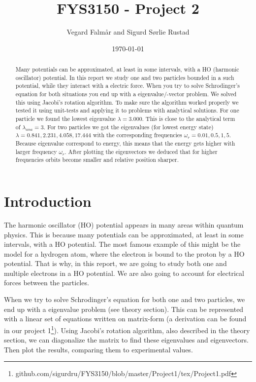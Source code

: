 \documentclass[reprint,english,notitlepage,nofootinbib]{revtex4-1}  %
\begin{document}
\title{FYS3150 - Project 2}
\date{\today}
\author{Vegard Falmår and Sigurd Sørlie Rustad}

\newpage

\begin{abstract}

	
Many potentials can be approximated, at least in some intervals, with a HO (harmonic oscillator) potential. In this report we study one and two particles bounded in a such potential, while they interact with a electric force. When you try to solve Schrodinger's equation for both situations you end up with a eigenvalue/-vector problem. We solved this using Jacobi's rotation algorithm. To make sure the algorithm worked properly we tested it using unit-tests and applying it to problems with analytical solutions. For one particle we found the lowest eigenvalue $\lambda = 3.000$. This is close to the analytical term of $\lambda_{ana} = 3$. For two particles we got the eigenvalues (for lowest energy state) $\lambda = 0.841, 2.231, 4.058, 17.444$ with the corresponding frequencies $\omega_r = 0.01, 0.5, 1, 5$. Because eigenvalue correspond to energy, this means that the energy gets higher with larger frequency $\omega_r$. After plotting the eigenvectors we deduced that for higher frequencies orbits become smaller and relative position sharper.
\end{abstract}
\maketitle


\section{Introduction}

The harmonic oscillator (HO) potential appears in many areas within quantum physics. This is because many potentials can be approximated, at least in some intervals, with a HO potential. The most famous example of this might be the model for a hydrogen atom, where the electron is bound to the proton by a HO potential. That is why, in this report, we are going to study both one and multiple electrons in a HO potential. We are also going to account for electrical forces between the particles.

When we try to solve Schrodinger's equation for both one and two particles, we end up with a eigenvalue problem (see theory section). This can be represented with a linear set of equations written on matrix-form (a derivation can be found in our project 1\footnote{github.com/sigurdru/FYS3150/blob/master/Project1/tex/Project1.pdf}). Using Jacobi's rotation algorithm, also described in the theory section, we can diagonalize the matrix to find these eigenvalues and eigenvectors. Then plot the results, comparing them to experimental values.
\end{document}
